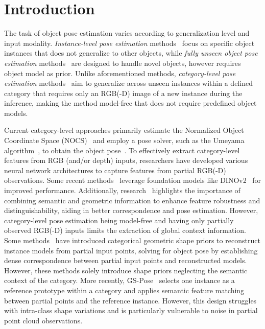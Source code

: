 \section{Introduction}
\label{sec:intr}
The task of object pose estimation varies according to generalization level and input modality. \textit{Instance-level pose estimation} methods~\cite{Wang_2021_GDRN,su2022zebrapose,hodan2024bop} focus on specific object instances that does not generalize to other objects, while \textit{fully unseen object pose estimation} methods~\cite{drost2010model,shugurov2022osop,huang2024matchu} are designed to handle novel objects, however requires object model as prior. Unlike aforementioned methods, \textit{category-level pose estimation} methods~\cite{nocs,lin2022category,chen2024secondpose} aim to generalize across unseen instances within a defined category that requires only an RGB(-D) image of a new instance during the inference, making the method model-free that does not require predefined object models.

Current category-level approaches primarily estimate the Normalized Object Coordinate Space (NOCS)~\cite{nocs} and employ a pose solver, such as the Umeyama algorithm~\cite{umeyama1991least}, to obtain the object pose~\cite{lin2022category}. To effectively extract category-level features from RGB (and/or depth) inputs, researchers have developed various neural network architectures to capture features from partial RGB(-D) observations. Some recent methods~\cite{ornek2025foundpose,nguyen2024gigapose,ausserlechner2024zs6d} leverage foundation models like DINOv2~\cite{oquab2023dinov2} for improved performance. Additionally, research~\cite{huang2024matchu,chen2024secondpose,caraffa2025freeze,lin2024sam} highlights the importance of combining semantic and geometric information to enhance feature robustness and distinguishability, aiding in better correspondence and pose estimation. However, category-level pose estimation being model-free and having only partially observed RGB(-D) inputs limits the extraction of global context information.
Some methods~\cite{tian2020shape,query6dof,chen2021sgpa,zhang2022rbp,lin2022category} have introduced categorical geometric shape priors to reconstruct instance models from partial input points, solving for object pose by establishing dense correspondence between partial input points and reconstructed models. However, these methods solely introduce shape priors neglecting the semantic context of the category. More recently, GS-Pose~\cite{wang2025gs} selects one instance as a reference prototype within a category and applies semantic feature matching between partial points and the reference instance. However, this design struggles with intra-class shape variations and is particularly vulnerable to noise in partial point cloud observations. 

